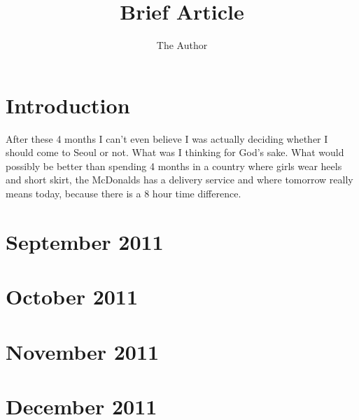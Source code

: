 \documentclass[11pt,twoside,a5paper,landscape]{book}
\title{Brief Article}
\author{The Author}
\newcommand{\newmonth}[2]{
	\def\monthstuff{#2}
	\chapter{#1}
    \def\monthstuff{}
	\startcontents[sections]
	\printcontents[sections]{l}{1}{{\setcounter{tocdepth}{1}}}
	\vfill
}
\def\monthstuff{}
\begin{document}



\chapter*{Introduction}
After these 4 months I can't even believe I was actually deciding whether I should come to Seoul or not. What was I thinking for God's sake. What would possibly be better than spending 4 months in a country where girls wear heels and short skirt, the McDonalds has a delivery service and where tomorrow really means today, because there is a 8 hour time difference.

\tableofcontents

\newmonth{September 2011}{``So it begins...''}



\newmonth{October 2011}{``I wonder if you know, how they live in Tokyo...''}



\newmonth{November 2011}{``The most expensive month so far...''}



\chapter{December 2011}
\end{document}

